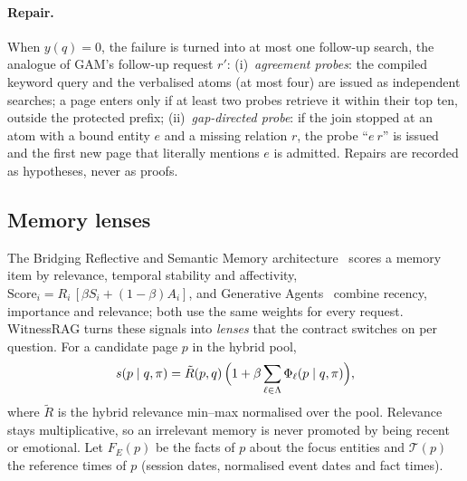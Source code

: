\paragraph{Repair.}
When $y(q)=0$, the failure is turned into at most one follow-up search, the
analogue of GAM's follow-up request $r'$:
(i)~\emph{agreement probes}: the compiled keyword query and the verbalised
atoms (at most four) are issued as independent searches; a page enters only
if at least two probes retrieve it within their top ten, outside the protected
prefix;
(ii)~\emph{gap-directed probe}: if the join stopped at an atom with a bound
entity $e$ and a missing relation $r$, the probe ``$e\ r$'' is issued and the
first new page that literally mentions $e$ is admitted.
Repairs are recorded as hypotheses, never as proofs.

\subsection{Memory lenses}\label{sec:lenses}

The Bridging Reflective and Semantic Memory architecture~\cite{flexa2026bridging}
scores a memory item by relevance, temporal stability and affectivity,
$\mathrm{Score}_i=R_i\,[\beta S_i+(1-\beta)A_i]$, and Generative
Agents~\cite{park2023generative} combine recency, importance and relevance;
both use the same weights for every request. WitnessRAG turns these signals into \emph{lenses} that the
contract switches on per question. For a candidate page $p$ in the hybrid pool,
\begin{equation}
  s(p\mid q,\pi)=\tilde R(p,q)\,\Bigl(1+\beta\sum_{\ell\in\Lambda}\Phi_\ell(p\mid q,\pi)\Bigr),
  \label{eq:lens-score}
\end{equation}
where $\tilde R$ is the hybrid relevance min--max normalised over the pool.
Relevance stays multiplicative, so an irrelevant memory is never promoted by
being recent or emotional. Let $F_E(p)$ be the facts of $p$ about the focus
entities and $\mathcal{T}(p)$ the reference times of $p$ (session dates,
normalised event dates and fact times).


